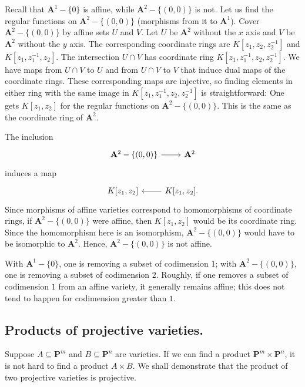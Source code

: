 \documentclass [11 pt, oneside] {article}
\begin{document}
\begin{example}[ ]\label{}
Recall that $\mathbf{A}^1-\{0\}$ is affine, while $\mathbf{A}^2 - \{(0,0)\}$ is not. Let us find the regular functions on $\mathbf{A}^2 - \{(0,0)\}$ (morphisms from it to $\mathbf{A}^1$). Cover $\mathbf{A}^2-\{(0,0)\}$ by affine sets $U$ and $V$. Let $U$ be $\mathbf{A}^2$ without the $x$ axis and $V$ be $\mathbf{A}^2$ without the $y$ axis. The corresponding coordinate rings are $K[z_1,z_2,z_2^{-1}]$ and $K[z_1,z_1^{-1},z_2]$. The intersection $U\cap V$ has coordinate ring $K[z_1,z_1^{-1},z_2,z_2^{-1}]$. We have maps from $U\cap V$ to $U$ and from $U\cap V$ to $V$ that induce dual maps of the coordinate rings. These corresponding maps are injective, so finding elements in either ring with the same image in $K[z_1,z_1^{-1},z_2,z_2^{-1}]$ is straightforward: One gets $K[z_1,z_2]$ for the regular functions on $\mathbf{A}^2-\{(0,0)\}$. This is the same as the coordinate ring of $\mathbf{A}^2$.

The inclusion 
\[
\begin{tikzcd}
\mathbf{A}^2-\{(0,0)\}\ar[r]& \mathbf{A}^2
\end{tikzcd}
\]
induces a map 
\[
\begin{tikzcd}
K[z_1,z_2] &\ar[l] K[z_1,z_2].
\end{tikzcd}
\]
Since morphisms of affine varieties correspond to homomorphisms of coordinate rings, if $\mathbf{A}^2-\{(0,0)\}$ were affine, then $K[z_1,z_2]$ would be its coordinate ring. Since the homomorphism here is an isomorphism, $\mathbf{A}^2-\{(0,0)\}$ would have to be isomorphic to $\mathbf{A}^2$. Hence, $\mathbf{A}^2-\{(0,0)\}$ is not affine.
\end{example}

\begin{remark}
	With $\mathbf{A}^1-\{0\}$, one is removing a subset of codimension $1$; with $\mathbf{A}^2-\{(0,0)\}$, one is removing a subset of codimension $2$. Roughly, if one removes a subset of codimension $1$ from an affine variety, it generally remains affine; this does not tend to happen for codimension greater than $1$.
\end{remark}


\subsection{Products of projective varieties.}
Suppose $A\subseteq \mathbf{P}^m$ and $B\subseteq \mathbf{P}^n$ are varieties. If we can find a product $\mathbf{P}^m\times \mathbf{P}^n$, it is not hard to find a product $A\times B$. We shall demonstrate that the product of two projective varieties is projective.
\end{document}
